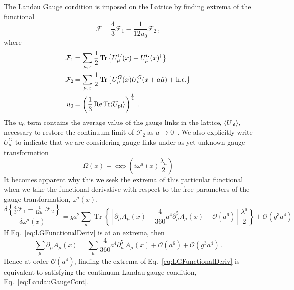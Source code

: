 The Landau Gauge condition is imposed on the Lattice by finding extrema of the functional~\cite{Bonnet:1999mj}
%
\begin{equation}
\mathcal{F} =  \frac{4}{3}\mathcal{F}_1 - \frac{1}{12u_0}\mathcal{F}_2\, ,
\label{eq:LGFunctional}
\end{equation}
%
where
%
\begin{align*}
\mathcal{F}_1 &= \sum _ { \mu , x } \frac { 1 } { 2 } \operatorname { Tr } \left\{ U _ { \mu } ^ { G } ( x ) + U _ { \mu } ^ { G } ( x ) ^ { \dagger } \right\}\\
\mathcal{F}_2 &= \sum _ { \mu , x } \frac { 1 } { 2 } \operatorname { Tr } \left\{ U _ { \mu } ^ { G } ( x ) U _ { \mu } ^ { G } ( x + a\hat { \mu } ) + \mathrm { h.c. } \right\}\\
u_0 &= \left(\frac{1}{3}\operatorname{ Re } \operatorname{Tr}\langle U_\text{pl} \rangle\right)^{\frac{1}{4}}\, .
\end{align*}
%
The $u_0$ term contains the average value of the gauge links in the lattice, $\langle U_\text{pl} \rangle$, necessary to restore the continuum limit of $\mathcal{F}_2$ as $a\rightarrow 0$~\cite{Lepage:1992xa}. We also explicitly write $U^G_\mu$ to indicate that we are considering gauge links under as-yet unknown gauge transformation 
%
\begin{equation}
\Omega(x) = \exp\left( i\omega^a(x)\frac{\lambda_a}{2} \right)
\end{equation}
%
It becomes apparent why this we seek the extrema of this particular functional when we take the functional derivative with respect to the free parameters of the gauge transformation, $\omega^a(x)$.
%
\begin{equation}
\frac { \delta \left\{ \frac { 4 } { 3 } \mathcal { F } _ { 1 } - \frac { 1 } { 12 u _ { 0 } } \mathcal { F } _ { 2 } \right\} } { \delta \omega ^ { a } ( x ) } = g a ^ { 2 } \sum _ { \mu } \operatorname { Tr } \left\{ \left[ \partial _ { \mu } A _ { \mu } ( x ) - \frac { 4 } { 360 } a ^ { 4 } \partial _ { \mu } ^ { 5 } A _ { \mu } ( x ) + \mathcal { O } \left( a ^ { 6 } \right) \right] \frac{\lambda^a}{2} \right\} + \mathcal { O } \left( g ^ { 3 } a ^ { 4 } \right)
\label{eq:LGFunctionalDeriv}
\end{equation}
%
If Eq.~\ref{eq:LGFunctionalDeriv} is at an extrema, then 
%
\begin{equation*}
\sum_\mu \partial_\mu A_\mu(x) = \sum_\mu \frac{4}{360}a^4 \partial_\mu^5\,A_\mu(x) + \mathcal{O}(a^6)+\mathcal{O}(g^3a^4)\, .
\end{equation*}
%
Hence at order $\mathcal{O}(a^4)$, finding the extrema of Eq.~\ref{eq:LGFunctionalDeriv} is equivalent to satisfying the continuum Landau gauge condition, Eq.~\ref{eq:LandauGaugeCont}.

